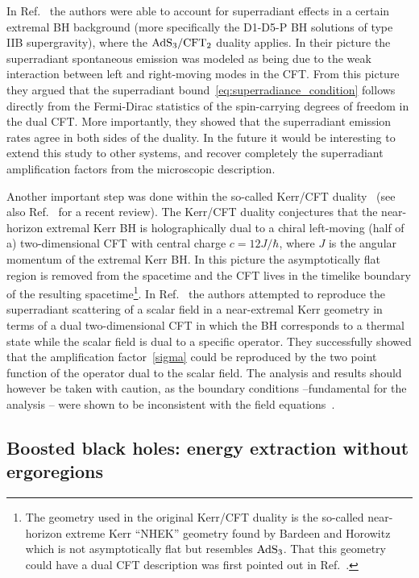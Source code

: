 \documentclass[11pt]{article}
\numberwithin{equation}{section} %
\begin{document}
In Ref.~\cite{Dias:2007nj} the authors were able to account for superradiant effects in a certain extremal BH background (more specifically the D1-D5-P BH solutions of type IIB supergravity), where the ${\rm AdS}_3/{\rm CFT}_2$ duality applies. In their picture the superradiant spontaneous emission was modeled as being due to the weak interaction between left and right-moving modes in the CFT. From this picture they argued that the superradiant bound~\eqref{eq:superradiance_condition} follows directly from the Fermi-Dirac statistics of the spin-carrying degrees of freedom in the dual CFT. More importantly, they showed that the superradiant emission rates agree in both sides of the duality. 
In the future it would be interesting to extend this study to other systems, and recover completely the superradiant amplification factors from the microscopic description.


Another important step was done within the so-called Kerr/CFT duality~\cite{Guica:2008mu} (see also Ref.~\cite{Compere:2012jk} for a recent review). The Kerr/CFT duality conjectures that the near-horizon extremal Kerr BH is holographically dual to a chiral left-moving (half of a) two-dimensional CFT with central charge $c=12J/\hbar$, where $J$ is the angular momentum of the extremal Kerr BH. In this picture the asymptotically flat region is removed from the spacetime and the CFT lives in the timelike boundary of the resulting spacetime\footnote{The geometry used in the original Kerr/CFT duality is the so-called near-horizon extreme Kerr ``NHEK'' geometry found by Bardeen and Horowitz~\cite{Bardeen:1999px} which is not asymptotically flat but resembles ${\rm AdS}_3$. That this geometry could have a dual CFT description was first pointed out in Ref.~\cite{Bardeen:1999px}.}. In Ref.~\cite{Bredberg:2009pv} the authors attempted to reproduce the superradiant scattering of a scalar field in a near-extremal Kerr geometry in terms of a dual two-dimensional CFT in which the BH corresponds to a thermal state while the scalar field is dual to a specific operator. They successfully showed that the amplification factor~\eqref{sigma} could be reproduced by the two point function of the operator dual to the scalar field. 
The analysis and results should however be taken with caution, as the boundary conditions --fundamental for the analysis -- were shown to be inconsistent with the field equations~\cite{Amsel:2009et,Dias:2009ex}.

\subsection{Boosted black holes: energy extraction without ergoregions}
\end{document}
